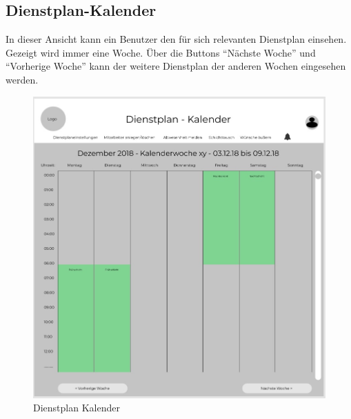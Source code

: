 \documentclass[11pt,
paper=a4,
bibtotocnumbered,	  %
liststotocnumbered,  %
DIV=calc,		  %
tablecaptionabove,	  %
headinclude,
]{article}
\begin{document}
\subsection{Dienstplan-Kalender}
In dieser Ansicht kann ein Benutzer den für sich relevanten Dienstplan einsehen. Gezeigt wird immer eine Woche. Über die Buttons “Nächste Woche” und “Vorherige Woche” kann der weitere Dienstplan der anderen Wochen eingesehen werden.
\begin{figure}[H]
\includegraphics[scale=1]{Bilder/Dienstplan-Kalender.jpg}
\caption{Dienstplan Kalender}
\end{figure}
\end{document}
